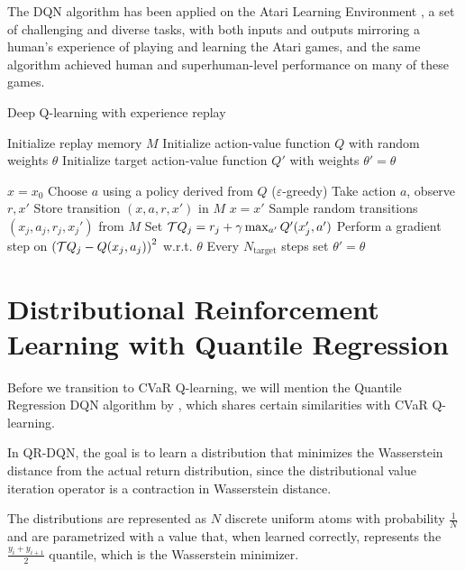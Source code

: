 The DQN algorithm has been applied on the Atari Learning Environment \citep{bellemare13arcade}, a set of challenging and diverse tasks, with both inputs and outputs mirroring a human's experience of playing and learning the Atari games, and the same algorithm achieved human and superhuman-level performance on many of these games.

\begin{algorithm}
\caption{Deep Q-learning with experience replay}
\begin{algorithmic}\label{alg:dqn}

    \STATE Initialize replay memory $M$
    \STATE Initialize action-value function $Q$ with random weights $\theta$
    \STATE Initialize target action-value function $Q'$ with weights $\theta'=\theta$

    \STATE $x=x_0$
	\STATE Choose $a$ using a policy derived from $Q$ ($\varepsilon$-greedy)
	\STATE Take action $a$, observe $r, x'$
	\STATE Store transition $(x, a, r, x')$ in $M$
	\STATE $x = x'$
	\STATE Sample random transitions $(x_j, a_j, r_j, x_j')$ from $M$
	\STATE Set $\mathcal{T} Q_j=r_j + \gamma \max_{a'} Q'(x_j', a')$
    \STATE Perform a gradient step on $\left( {\mathcal{T} Q_j - Q(x_j, a_j)} \right)^2$ w.r.t. $\theta$
    \STATE Every $N_\text{target}$ steps set $\theta'=\theta$
	\ENDWHILE
	\ENDFOR
	
\end{algorithmic}
\end{algorithm}

\section{Distributional Reinforcement Learning with Quantile Regression}\label{sec:dqn:qrdqn}
Before we transition to CVaR Q-learning, we will mention the Quantile Regression DQN algorithm by \citet{dabney2017distributional}, which shares certain similarities with CVaR Q-learning.

In QR-DQN, the goal is to learn a distribution that minimizes the Wasserstein distance from the actual return distribution, since the distributional value iteration operator is a contraction in Wasserstein distance. 

The distributions are represented as $N$ discrete uniform atoms with probability $\frac{1}{N}$ and are parametrized with a value that, when learned correctly, represents the $\frac{y_{i}+y_{i+1}}{2}$ quantile, which is the Wasserstein minimizer.

